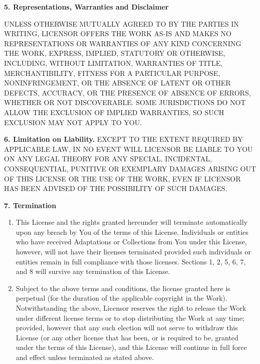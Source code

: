     \noindent \textbf{5. Representations, Warranties and Disclaimer}
    
    \noindent UNLESS OTHERWISE MUTUALLY AGREED TO BY THE PARTIES IN WRITING, LICENSOR OFFERS THE WORK AS-IS AND MAKES NO REPRESENTATIONS OR WARRANTIES OF ANY KIND CONCERNING THE WORK, EXPRESS, IMPLIED, STATUTORY OR OTHERWISE, INCLUDING, WITHOUT LIMITATION, WARRANTIES OF TITLE, MERCHANTIBILITY, FITNESS FOR A PARTICULAR PURPOSE, NONINFRINGEMENT, OR THE ABSENCE OF LATENT OR OTHER DEFECTS, ACCURACY, OR THE PRESENCE OF ABSENCE OF ERRORS, WHETHER OR NOT DISCOVERABLE. SOME JURISDICTIONS DO NOT ALLOW THE EXCLUSION OF IMPLIED WARRANTIES, SO SUCH EXCLUSION MAY NOT APPLY TO YOU.
    
    \noindent \textbf{6. Limitation on Liability.} EXCEPT TO THE EXTENT REQUIRED BY APPLICABLE LAW, IN NO EVENT WILL LICENSOR BE LIABLE TO YOU ON ANY LEGAL THEORY FOR ANY SPECIAL, INCIDENTAL, CONSEQUENTIAL, PUNITIVE OR EXEMPLARY DAMAGES ARISING OUT OF THIS LICENSE OR THE USE OF THE WORK, EVEN IF LICENSOR HAS BEEN ADVISED OF THE POSSIBILITY OF SUCH DAMAGES.
    
    \noindent \textbf{7. Termination}
    
    \begin{enumerate}[noitemsep,label=\alph*.]
      
      \item This License and the rights granted hereunder will terminate automatically upon any breach by You of the terms of this License. Individuals or entities who have received Adaptations or Collections from You under this License, however, will not have their licenses terminated provided such individuals or entities remain in full compliance with those licenses. Sections 1, 2, 5, 6, 7, and 8 will survive any termination of this License.
      
      \item Subject to the above terms and conditions, the license granted here is perpetual (for the duration of the applicable copyright in the Work). Notwithstanding the above, Licensor reserves the right to release the Work under different license terms or to stop distributing the Work at any time; provided, however that any such election will not serve to withdraw this License (or any other license that has been, or is required to be, granted under the terms of this License), and this License will continue in full force and effect unless terminated as stated above.
      
    \end{enumerate}
    
